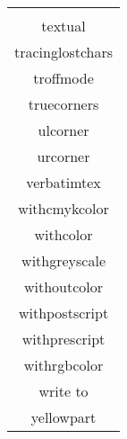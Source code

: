 \begin{table}
\begin{tabular}{|c|}
\begin{minipage}[b]{.75\linewidth}
\begin{multicols}{3}
textpart\\
textual\\
tracinglostchars\\
troffmode\\
truecorners\\
ulcorner\\
urcorner\\
verbatimtex\\
withcmykcolor\\
withcolor\\
withgreyscale\\
withoutcolor\\
withpostscript\\
withprescript\\
withrgbcolor\\
write to\\
yellowpart
\end{multicols}
\end{minipage}\\\hline


\end{tabular}
\end{table}
